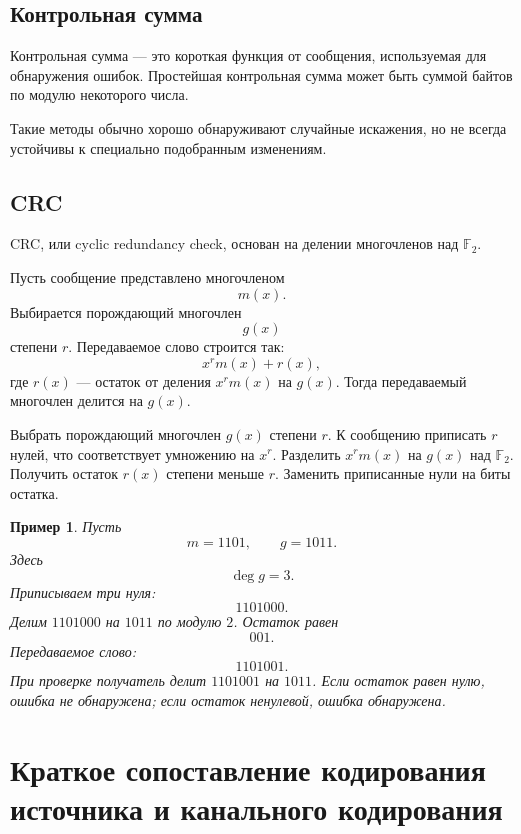 \documentclass[12pt,a4paper]{article}
\newtheorem{example}{Пример}[section]
\newcommand{\F}{\mathbb{F}}
\begin{document}
\subsection{Контрольная сумма}

Контрольная сумма --- это короткая функция от сообщения, используемая для обнаружения ошибок.
Простейшая контрольная сумма может быть суммой байтов по модулю некоторого числа.

Такие методы обычно хорошо обнаруживают случайные искажения, но не всегда устойчивы к специально подобранным изменениям.

\subsection{CRC}

CRC, или cyclic redundancy check, основан на делении многочленов над $\F_2$.

Пусть сообщение представлено многочленом
\[
    m(x).
\]
Выбирается порождающий многочлен
\[
    g(x)
\]
степени $r$.
Передаваемое слово строится так:
\[
    x^r m(x)+r(x),
\]
где $r(x)$ --- остаток от деления $x^r m(x)$ на $g(x)$.
Тогда передаваемый многочлен делится на $g(x)$.

\begin{algorithm}[H]
\caption{CRC-кодирование}
\begin{algorithmic}[1]
\STATE Выбрать порождающий многочлен $g(x)$ степени $r$.
\STATE К сообщению приписать $r$ нулей, что соответствует умножению на $x^r$.
\STATE Разделить $x^r m(x)$ на $g(x)$ над $\F_2$.
\STATE Получить остаток $r(x)$ степени меньше $r$.
\STATE Заменить приписанные нули на биты остатка.
\end{algorithmic}
\end{algorithm}

\begin{example}
Пусть
\[
    m=1101,\qquad g=1011.
\]
Здесь
\[
    \deg g=3.
\]
Приписываем три нуля:
\[
    1101000.
\]
Делим $1101000$ на $1011$ по модулю $2$.
Остаток равен
\[
    001.
\]
Передаваемое слово:
\[
    1101001.
\]
При проверке получатель делит $1101001$ на $1011$.
Если остаток равен нулю, ошибка не обнаружена; если остаток ненулевой, ошибка обнаружена.
\end{example}

\section{Краткое сопоставление кодирования источника и канального кодирования}
\end{document}
